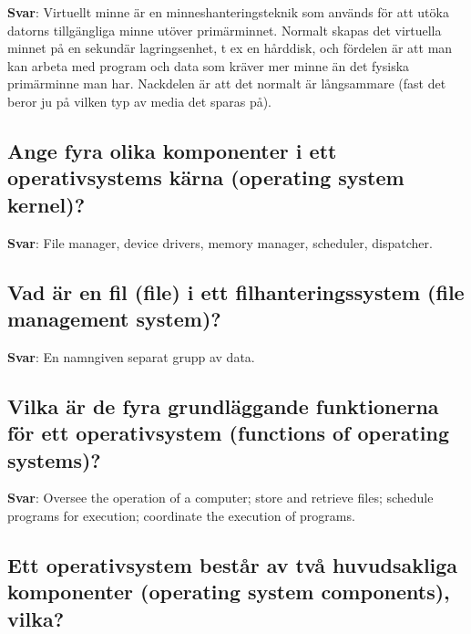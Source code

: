\documentclass[a4paper,11pt,oneside]{article}
\begin{document}
\begin{sloppypar}
\label{q:113:sa:sv:True}

\textbf{Svar}: Virtuellt minne \"ar en minneshanteringsteknik som anv\"ands f\"or att ut\"oka datorns tillg\"angliga minne ut\"over prim\"arminnet. Normalt skapas det virtuella minnet p\r{a} en sekund\"ar lagringsenhet, t ex en h\r{a}rddisk, och f\"ordelen \"ar att man kan arbeta med program och data som kr\"aver mer minne \"an det fysiska prim\"arminne man har. Nackdelen \"ar att det normalt \"ar l\r{a}ngsammare (fast det beror ju p\r{a} vilken typ av media det sparas p\r{a}).



\subsection{Ange fyra olika komponenter i ett operativsystems k\"arna (operating system kernel)?}

\label{q:114:sa:sv:True}

\textbf{Svar}: File manager, device drivers, memory manager, scheduler, dispatcher.



\subsection{Vad \"ar en fil (file) i ett filhanteringssystem (file management system)?}

\label{q:115:sa:sv:True}

\textbf{Svar}: En namngiven separat grupp av data.



\subsection{Vilka \"ar de fyra grundl\"aggande funktionerna f\"or ett operativsystem (functions of operating systems)?}

\label{q:116:sa:sv:True}

\textbf{Svar}: Oversee the operation of a computer; store and retrieve files; schedule programs for execution; coordinate the execution of programs.



\subsection{Ett operativsystem best\r{a}r av tv\r{a} huvudsakliga komponenter (operating system components), vilka?}

\label{q:118:sa:sv:True}


\end{sloppypar}
\end{document}
